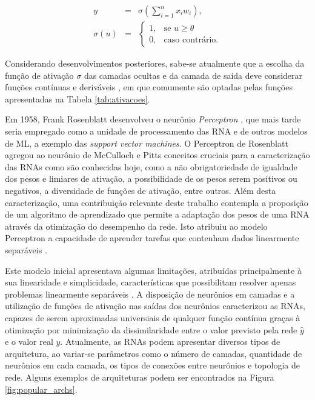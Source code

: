 \begin{eqnarray}\label{eq:funcao_neuronio}
	y &=& \sigma\left( \sum_{i=1}^n x_i w_i\right),\\
	\sigma(u) &=& \begin{cases}
		1, & \text{se } u \geq \theta\label{eq:ativacao_limiar}\\
		0, & \text{caso contrário.}
	\end{cases}
\end{eqnarray}


Considerando desenvolvimentos posteriores, sabe-se atualmente que a escolha da função de ativação $\sigma$ das camadas ocultas e da camada de saída deve considerar funções contínuas e deriváveis \cite{hornik1991approximation}, em que comumente são optadas pelas funções apresentadas na Tabela  \ref{tab:ativacoes}.


 


Em 1958, Frank Rosenblatt desenvolveu o neurônio \emph{Perceptron} \cite{rosenblatt1958perceptron}, que mais tarde seria empregado como a unidade de processamento das RNA e de outros modelos de ML, a exemplo das \emph{support vector machines}. O Perceptron de Rosenblatt agregou ao neurônio de McCulloch e Pitts conceitos cruciais para a caracterização das RNAs como são conhecidas hoje, como a não obrigatoriedade de igualdade dos pesos e limiares de ativação, a possibilidade de os pesos serem positivos ou negativos, a diversidade de funções de ativação, entre outros. Além desta caracterização, uma contribuição relevante deste trabalho contempla a proposição de um algoritmo de aprendizado que permite a adaptação dos pesos de uma RNA através da otimização do desempenho da rede. Isto atribuiu ao modelo Perceptron a capacidade de aprender tarefas que contenham dados linearmente separáveis \cite{Teresa:Livro}.

Este modelo inicial apresentava algumas limitações, atribuídas principalmente à sua linearidade e simplicidade, características que possibilitam resolver apenas problemas linearmente separáveis \cite{Teresa:Livro}. A disposição de neurônios em camadas e a utilização de funções de ativação nas saídas dos neurônios caracterizou as RNAs, capazes de serem aproximadas universiais de qualquer função contínua graças à otimização por minimização da dissimilaridade entre o valor previsto pela rede $\hat{y}$ e o valor real $y$. Atualmente, as RNAs podem apresentar diversos tipos de arquitetura, ao variar-se parâmetros como o número de camadas, quantidade de neurônios em cada camada, os tipos de conexões entre neurônios e topologia de rede. Alguns exemplos de arquiteturas podem ser encontrados na Figura \ref{fig:popular_archs}.

